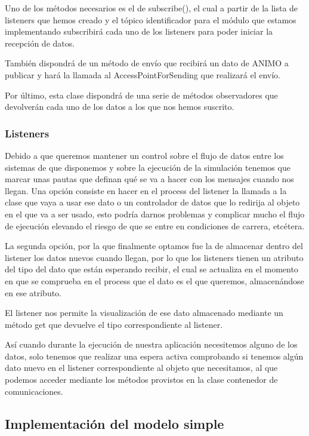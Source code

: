 \documentclass[12pt,a4paper,spanish]{book} %
\begin{document}
Uno de los métodos necesarios es el de subscribe(), el cual a partir de la lista de listeners que hemos creado y el tópico identificador para el módulo que estamos implementando subscribirá cada uno de los listeners para poder iniciar la recepción de datos.

También dispondrá de un método de envío que recibirá un dato de ANIMO a publicar y hará la llamada al AccessPointForSending que realizará el envío.

Por último, esta clase dispondrá de una serie de métodos observadores que devolverán cada uno de los datos a los que nos hemos suscrito.

\subsubsection{Listeners}

Debido a que queremos mantener un control sobre el flujo de datos entre los sistemas de que disponemos y sobre la ejecución de la simulación tenemos que marcar unas pautas que definan qué se va a hacer con los mensajes cuando nos llegan. Una opción consiste en hacer en el process del listener la llamada a la clase que vaya a usar ese dato o un controlador de datos que lo redirija al objeto en el que va a ser usado, esto podría darnos problemas y complicar mucho el flujo de ejecución elevando el riesgo de que se entre en condiciones de carrera, etcétera.

La segunda opción, por la que finalmente optamos fue la de almacenar dentro del listener los datos nuevos cuando llegan, por lo que los listeners tienen un atributo del tipo del dato que están esperando recibir, el cual se actualiza en el momento en que se comprueba en el process que el dato es el que queremos, almacenándose en ese atributo.

El listener nos permite la visualización de ese dato almacenado mediante un método get que devuelve el tipo correspondiente al listener.

Así cuando durante la ejecución de nuestra aplicación necesitemos alguno de los datos, solo tenemos que realizar una espera activa comprobando si tenemos algún dato nuevo en el listener correspondiente al objeto que necesitamos, al que podemos acceder mediante los métodos provistos en la clase contenedor de comunicaciones.

\subsection{Implementación del modelo simple}
\end{document}
